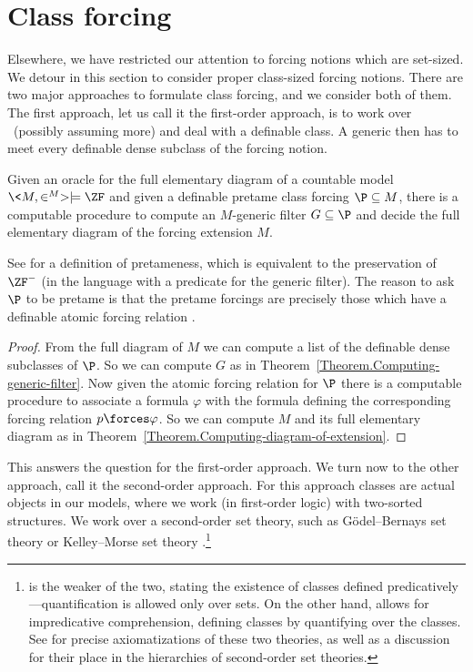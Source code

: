 \documentclass{amsart}
\begin{document}
\section{Class forcing}\label{Section.Class-forcing}
Elsewhere, we have restricted our attention to forcing notions which are set-sized. We detour in this section to consider proper class-sized forcing notions. There are two major approaches to formulate class forcing, and we consider both of them.
The first approach, let us call it the first-order approach, is to work over \ZF\ (possibly assuming more) and deal with a definable class. A generic then has to meet every definable dense subclass of the forcing notion.
\begin{theorem}
Given an oracle for the full elementary diagram of a countable model $\<M,\in^M> \models \ZF$ and given a definable pretame class forcing $\P \subseteq M$, there is a computable procedure to compute an $M$-generic filter $G \subseteq \P$ and decide the full elementary diagram of the forcing extension $M$.
\end{theorem}
See \cite{friedman:book} for a definition of pretameness, which is equivalent to the preservation of $\ZF^-$ (in the language with a predicate for the generic filter). The reason to ask $\P$ to be pretame is that the pretame forcings are precisely those which have a definable atomic forcing relation \cite{HKS2018}.
\begin{proof}
From the full diagram of $M$ we can compute a list of the definable dense subclasses of $\P$. So we can compute $G$ as in Theorem~\ref{Theorem.Computing-generic-filter}. Now given the atomic forcing relation for $\P$ there is a computable procedure to associate a formula $\varphi$ with the formula defining the corresponding forcing relation $p \forces \varphi$. So we can compute $M$ and its full elementary diagram as in Theorem~\ref{Theorem.Computing-diagram-of-extension}.
\end{proof}
This answers the question for the first-order approach. We turn now to the other approach, call it the second-order approach. For this approach classes are actual objects in our models, where we work (in first-order logic) with two-sorted structures. We work over a second-order set theory, such as G\"odel--Bernays set theory \GB{} or Kelley--Morse set theory \KM.\footnote{\GB{} is the weaker of the two, stating the existence of classes defined predicatively---quantification is allowed only over sets. On the other hand, \KM{} allows for impredicative comprehension, defining classes by quantifying over the classes. See \cite{williams-min-km} for precise axiomatizations of these two theories, as well as a discussion for their place in the hierarchies of second-order set theories.}
\end{document}
